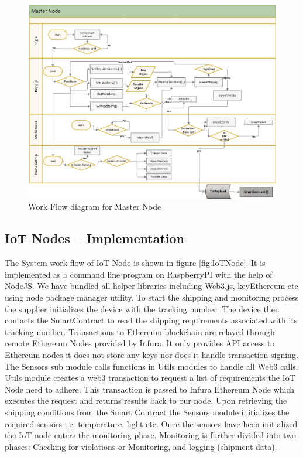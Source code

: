 \begin{figure}[h]
	\centering
    \includegraphics[width=175mm,scale=1]{figs/master-workflow}
	\caption{Work Flow diagram for Master Node}
	\label{fig:master-workflow} 
\end{figure}
\clearpage
\vspace{0.5cm}
\subsection{IoT Nodes – Implementation} \label{IoT-Nodes} 
The System work flow of IoT Node is shown in figure \ref{fig:IoTNode}. It is implemented as a command line program on RaspberryPI with the help of NodeJS. We have bundled all helper libraries including Web3.js, keyEthereum etc using node package manager utility. To start the shipping and monitoring process the supplier initializes the device with the tracking number. The device then contacts the SmartContract to read the shipping requirements associated with its tracking number. Transactions to Ethereum blockchain are relayed through remote Ethereum Nodes provided by Infura. It only provides API access to Ethereum nodes it does not store any keys nor does it handle transaction signing. The Sensors sub module calls functions in Utils modules to handle all Web3 calls. Utils module creates a web3 transaction to request a list of requirements the IoT Node need to adhere. This transaction is passed to Infura Ethereum Node which executes the request and returns results back to our node. Upon retrieving the shipping conditions from the Smart Contract the Sensors module initializes the required sensors i.e. temperature, light etc. Once the sensors have been initialized the IoT node enters the monitoring phase.  Monitoring is further divided into two phases: Checking for violations or Monitoring, and logging (shipment data).


